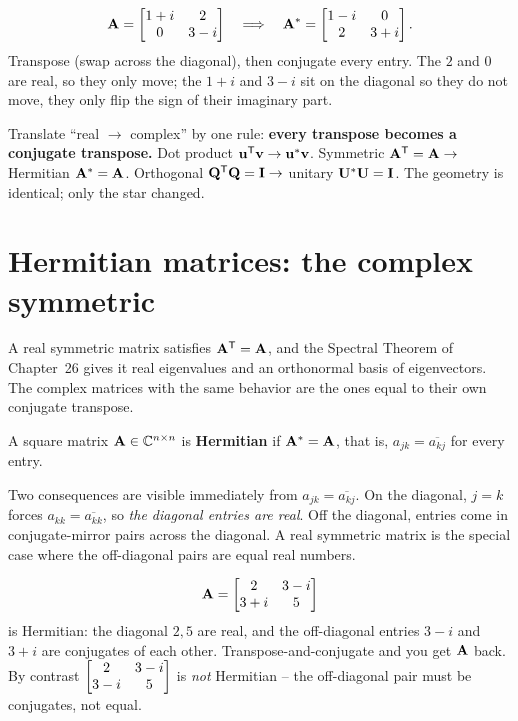 \begin{example}\label{ch32:starex}
\[
  \mathbf{A} = \begin{bmatrix}1+i & 2 \\ 0 & 3-i\end{bmatrix}
  \quad\Longrightarrow\quad
  \mathbf{A}^{*} = \begin{bmatrix}1-i & 0 \\ 2 & 3+i\end{bmatrix}.
\]
Transpose (swap across the diagonal), then conjugate every entry. The $2$ and $0$
are real, so they only move; the $1+i$ and $3-i$ sit on the diagonal so they do not move, they only flip the sign
of their imaginary part.
\end{example}

\begin{focusbox}
Translate ``real $\to$ complex'' by one rule: \textbf{every transpose becomes a
conjugate transpose.} Dot product $\mathbf{u}^{\mathsf{T}}\mathbf{v}\to\mathbf{u}^{*}\mathbf{v}$. Symmetric
$\mathbf{A}^{\mathsf{T}}=\mathbf{A}\to$ Hermitian $\mathbf{A}^{*}=\mathbf{A}$. Orthogonal
$\mathbf{Q}^{\mathsf{T}}\mathbf{Q}=\mathbf{I}\to$ unitary $\mathbf{U}^{*}\mathbf{U}=\mathbf{I}$. The geometry is
identical; only the star changed.
\end{focusbox}

\section{Hermitian matrices: the complex symmetric}

A real symmetric matrix satisfies $\mathbf{A}^{\mathsf{T}}=\mathbf{A}$, and the Spectral Theorem of
Chapter~26 gives it real eigenvalues and an orthonormal basis of eigenvectors.
The complex matrices with the same behavior are the ones equal to their own
conjugate transpose.

\begin{definition}\label{ch32:hermdef}
A square matrix $\mathbf{A}\in\mathbb{C}^{n\times n}$ is \textbf{Hermitian} if
$\mathbf{A}^{*} = \mathbf{A}$, that is, $a_{jk} = \overline{a_{kj}}$ for every entry.
\end{definition}

Two consequences are visible immediately from $a_{jk}=\overline{a_{kj}}$. On the
diagonal, $j=k$ forces $a_{kk}=\overline{a_{kk}}$, so \emph{the diagonal entries
are real}. Off the diagonal, entries come in conjugate-mirror pairs across the
diagonal. A real symmetric matrix is the special case where the off-diagonal pairs
are equal real numbers.

\begin{example}\label{ch32:hermex}
\[
  \mathbf{A} = \begin{bmatrix}2 & 3-i \\ 3+i & 5\end{bmatrix}
\]
is Hermitian: the diagonal $2,5$ are real, and the off-diagonal entries $3-i$ and
$3+i$ are conjugates of each other. Transpose-and-conjugate and you get $\mathbf{A}$
back. By contrast $\begin{bmatrix}2 & 3-i\\3-i & 5\end{bmatrix}$ is \emph{not} Hermitian -- the
off-diagonal pair must be conjugates, not equal.
\end{example}

